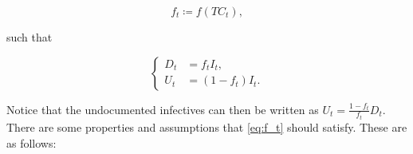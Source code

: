 \documentclass[12pt]{article}
\begin{document}
    	\begin{equation} \label{eq:f_t}
    	    f_t \coloneqq f(TC_t),
    	\end{equation}
	
	\noindent such that
	
    	\begin{equation*}
        	\begin{cases}
            	D_t &= f_t I_t, \\
            	U_t &= (1-f_t) I_t.
        	\end{cases}
    	\end{equation*}
    	
	\noindent Notice that the undocumented infectives can then be written as $U_t = \frac{1-f_t}{f_t}D_t$. \\
	
	There are some properties and assumptions that \eqref{eq:f_t} should satisfy. These are as follows:
\end{document}
